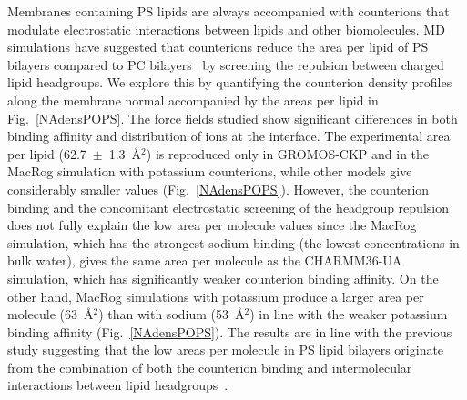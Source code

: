 \documentclass[aps,prl,superscriptaddress,twocolumn]{revtex4}
\begin{document}
Membranes containing PS lipids are always accompanied with counterions that
modulate electrostatic interactions between lipids and other biomolecules. MD simulations have suggested
that counterions reduce the area per lipid of PS bilayers compared to PC
bilayers~\cite{pandit02,mukhopadhyay04,pedersen06} by screening the repulsion between charged lipid headgroups. We explore this by quantifying the counterion density profiles along the membrane normal accompanied by the areas per lipid in Fig.~\ref{NAdensPOPS}.
The force fields studied show significant differences in both binding affinity
and distribution of ions at the interface.
The experimental area per lipid (62.7~$\pm$~1.3~\AA$^2$) \cite{pan14} 
is reproduced only in GROMOS-CKP and in the MacRog simulation
with potassium counterions, while other models give considerably smaller values (Fig.~\ref{NAdensPOPS}).
However, the counterion binding and the concomitant electrostatic screening of the headgroup
repulsion does not fully explain the low area per molecule values
since the MacRog simulation, which has the strongest sodium binding
(the lowest concentrations in bulk water), gives the same area per molecule
as the CHARMM36-UA simulation, which has significantly weaker counterion binding
affinity. On the other hand, MacRog simulations with potassium produce a larger area per molecule (63~\AA$^2$) than
with sodium (53~\AA$^2$) in line with the weaker potassium binding affinity (Fig.~\ref{NAdensPOPS}).
The results are in line with the previous study suggesting that the
low areas per molecule in PS lipid bilayers originate from the combination
of both the counterion binding and intermolecular interactions between lipid headgroups~\cite{petrache04}.
\end{document}
